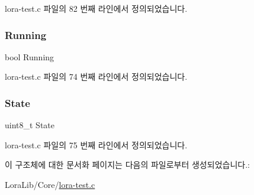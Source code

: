 lora-\/test.\+c 파일의 82 번째 라인에서 정의되었습니다.

\mbox{\label{struct_compliance_test__s_ae2e97f1ebd7c956e2c68d1209eabd4b1}} 
\subsubsection{\texorpdfstring{Running}{Running}}
{\footnotesize\ttfamily bool Running}



lora-\/test.\+c 파일의 74 번째 라인에서 정의되었습니다.

\mbox{\label{struct_compliance_test__s_a9ac4c1f881137da2601ed5d333bb5989}} 
\subsubsection{\texorpdfstring{State}{State}}
{\footnotesize\ttfamily uint8\+\_\+t State}



lora-\/test.\+c 파일의 75 번째 라인에서 정의되었습니다.



이 구조체에 대한 문서화 페이지는 다음의 파일로부터 생성되었습니다.\+:\begin{DoxyCompactItemize}
\item 
Lora\+Lib/\+Core/\mbox{\hyperlink{lora-test_8c}{lora-\/test.\+c}}\end{DoxyCompactItemize}
